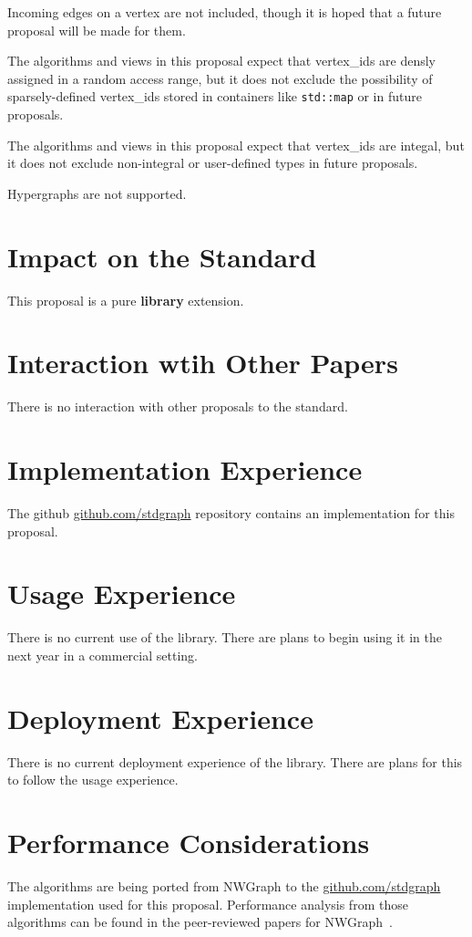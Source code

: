 Incoming edges on a vertex are not included, though it is hoped that a future proposal will be made for them.

The algorithms and views in this proposal expect that vertex\_ids are densly assigned in a random access range, but it does not exclude the possibility of 
sparsely-defined vertex\_ids stored in containers like \lstinline{std::map} or  in future proposals. 

The algorithms and views in this proposal expect that vertex\_ids are integal, but it does not exclude non-integral or user-defined types in future proposals.

Hypergraphs are not supported.

\section{Impact on the Standard}
This proposal is a pure \textbf{library} extension.

\section{Interaction wtih Other Papers}
There is no interaction with other proposals to the standard.

\section{Implementation Experience}
The github \href{https://github.com/stdgraph}{github.com/stdgraph} repository contains an implementation for this proposal.

\section{Usage Experience}
There is no current use of the library. There are plans to begin using it in the next year in a commercial setting.

\section{Deployment Experience}
There is no current deployment experience of the library. There are plans for this to follow the usage experience.

\section{Performance Considerations}
The algorithms are being ported from NWGraph to the \href{https://github.com/stdgraph}{github.com/stdgraph} implementation used for this proposal. Performance analysis from those algorithms can be found in the peer-reviewed papers for NWGraph~\cite{REF_nwgraph_paper,gapbs_2023}.


